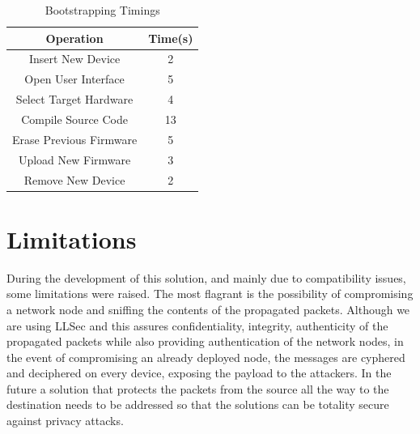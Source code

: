 \begin{table}
\centering
\caption{Bootstrapping Timings}
\label{tab:bootstrapping_time}
\begin{tabular}{|c|c|} \hline
Operation&Time(s)\\ \hline
Insert New Device&2\\ \hline
Open User Interface&5\\ \hline
Select Target Hardware&4\\ \hline
Compile Source Code&13\\ \hline
Erase Previous Firmware&5\\ \hline
Upload New Firmware&3\\ \hline
Remove New Device&2\\ 
\hline\end{tabular}
\end{table}

\section{Limitations}
During the development of this solution, and mainly due to compatibility issues, some limitations were raised. The most flagrant is the possibility of compromising a network node and sniffing the contents of the propagated packets. Although we are using \gls{LLSec} and this assures confidentiality, integrity, authenticity of the propagated packets while also providing authentication of the network nodes, in the event of compromising an already deployed node, the messages are cyphered and deciphered on every device, exposing the payload to the attackers. In the future a solution that protects the packets from the source all the way to the destination needs to be addressed so that the solutions can be totality secure against privacy attacks.


